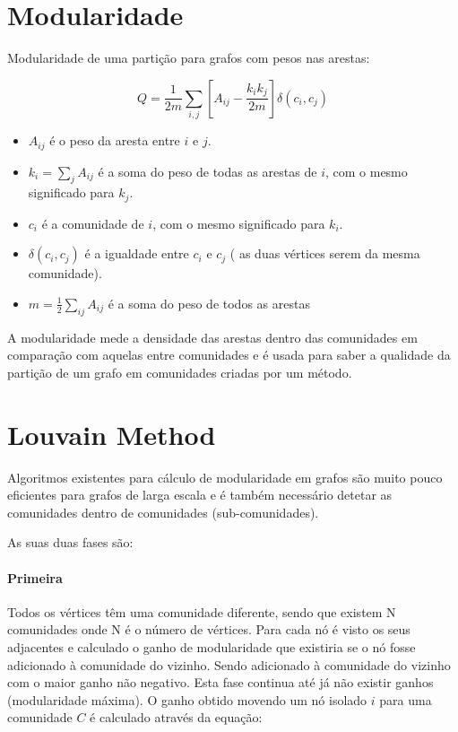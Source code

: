 \documentclass[a4paper,10pt]{report}
\begin{document}
\section*{Modularidade}

Modularidade de uma partição para grafos com pesos nas arestas:

\[Q = \frac{1}{2m} \sum_{i,j} [ A_{ij} - \frac{k_i k_j}{2m} ] \delta(c_i ,c_j)\]

\begin{itemize}
	\item $A_{ij}$ é o peso da aresta entre $i$ e $j$.
	\item $k_i = \sum_j A_{ij}$ é a soma do peso de todas as arestas de $i$, com o mesmo significado para $k_j$.
	\item $c_i$ é a comunidade de $i$, com o mesmo significado para $k_i$.
	\item $\delta(c_i,c_j)$ é a igualdade entre $c_i$ e $c_j$ ( as duas vértices serem da mesma comunidade).
	\item $m = \frac{1}{2}\sum_{ij} A_{ij}$ é a soma do peso de todos as arestas %
\end{itemize}

A modularidade mede a densidade das arestas dentro das comunidades em comparação com aquelas entre comunidades e é usada para saber a qualidade da partição de um grafo em comunidades criadas por um método. 


\section*{Louvain Method}
Algoritmos existentes para cálculo de modularidade em grafos são muito pouco eficientes para grafos de larga escala e é também necessário detetar as comunidades dentro de comunidades (sub-comunidades).

As suas duas fases são:

\paragraph{Primeira}
Todos os vértices têm uma comunidade diferente, sendo que existem N comunidades onde N é o número de vértices.
Para cada nó é visto os seus adjacentes e calculado o ganho de modularidade que existiria se o nó fosse adicionado à comunidade do vizinho. Sendo adicionado à comunidade do vizinho com o maior ganho não negativo. Esta fase continua até já não existir ganhos (modularidade máxima).
O ganho obtido movendo um nó isolado $i$ para uma comunidade $C$ é calculado através da equação:
\end{document}
